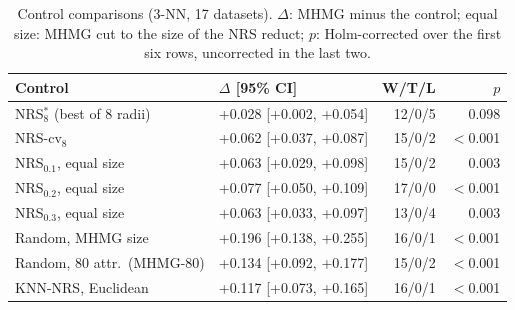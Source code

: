 \begin{table}[!t]
\centering
\caption{Control comparisons (3-NN, 17 datasets). $\Delta$: MHMG minus the control; equal size: MHMG cut to the size of the NRS reduct; $p$: Holm-corrected over the first six rows, uncorrected in the last two.}
\label{tab:ctrl}
\scriptsize
\setlength{\tabcolsep}{2.5pt}
\begin{tabular*}{\columnwidth}{@{\extracolsep{\fill}}llrr@{}}
\toprule
Control & $\Delta$ [95\% CI] & W/T/L & $p$ \\
\midrule
NRS$^*_8$ (best of 8 radii) & +0.028 [+0.002, +0.054] & 12/0/5 & 0.098 \\
NRS-cv$_8$ & +0.062 [+0.037, +0.087] & 15/0/2 & $<$0.001 \\
NRS$_{0.1}$, equal size & +0.063 [+0.029, +0.098] & 15/0/2 & 0.003 \\
NRS$_{0.2}$, equal size & +0.077 [+0.050, +0.109] & 17/0/0 & $<$0.001 \\
NRS$_{0.3}$, equal size & +0.063 [+0.033, +0.097] & 13/0/4 & 0.003 \\
Random, MHMG size & +0.196 [+0.138, +0.255] & 16/0/1 & $<$0.001 \\
\midrule
Random, 80 attr.\ (MHMG-80) & +0.134 [+0.092, +0.177] & 15/0/2 & $<$0.001 \\
KNN-NRS, Euclidean & +0.117 [+0.073, +0.165] & 16/0/1 & $<$0.001 \\
\bottomrule
\end{tabular*}
\end{table}
